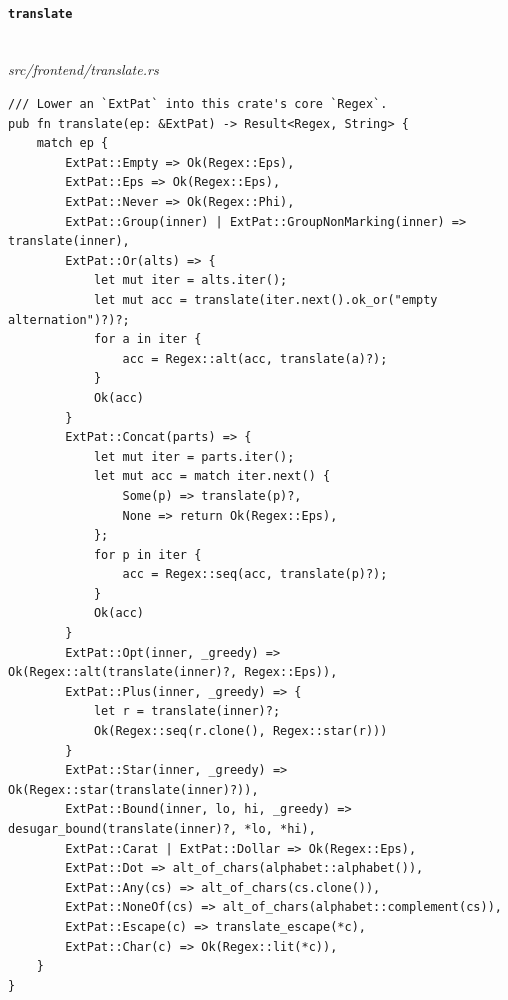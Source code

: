\paragraph{\texttt{translate}}\ \\[-0.4em]
\textit{\small src/frontend/translate.rs}
{\scriptsize\begin{verbatim}
/// Lower an `ExtPat` into this crate's core `Regex`.
pub fn translate(ep: &ExtPat) -> Result<Regex, String> {
    match ep {
        ExtPat::Empty => Ok(Regex::Eps),
        ExtPat::Eps => Ok(Regex::Eps),
        ExtPat::Never => Ok(Regex::Phi),
        ExtPat::Group(inner) | ExtPat::GroupNonMarking(inner) => translate(inner),
        ExtPat::Or(alts) => {
            let mut iter = alts.iter();
            let mut acc = translate(iter.next().ok_or("empty alternation")?)?;
            for a in iter {
                acc = Regex::alt(acc, translate(a)?);
            }
            Ok(acc)
        }
        ExtPat::Concat(parts) => {
            let mut iter = parts.iter();
            let mut acc = match iter.next() {
                Some(p) => translate(p)?,
                None => return Ok(Regex::Eps),
            };
            for p in iter {
                acc = Regex::seq(acc, translate(p)?);
            }
            Ok(acc)
        }
        ExtPat::Opt(inner, _greedy) => Ok(Regex::alt(translate(inner)?, Regex::Eps)),
        ExtPat::Plus(inner, _greedy) => {
            let r = translate(inner)?;
            Ok(Regex::seq(r.clone(), Regex::star(r)))
        }
        ExtPat::Star(inner, _greedy) => Ok(Regex::star(translate(inner)?)),
        ExtPat::Bound(inner, lo, hi, _greedy) => desugar_bound(translate(inner)?, *lo, *hi),
        ExtPat::Carat | ExtPat::Dollar => Ok(Regex::Eps),
        ExtPat::Dot => alt_of_chars(alphabet::alphabet()),
        ExtPat::Any(cs) => alt_of_chars(cs.clone()),
        ExtPat::NoneOf(cs) => alt_of_chars(alphabet::complement(cs)),
        ExtPat::Escape(c) => translate_escape(*c),
        ExtPat::Char(c) => Ok(Regex::lit(*c)),
    }
}
\end{verbatim}}

